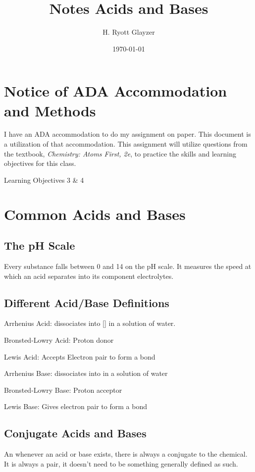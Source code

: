 \documentclass[11pt, letterpaper]{article}
\begin{document}


\title{Notes Acids and Bases}
\author{H. Ryott Glayzer}
\date{\today}


\maketitle


\section*{Notice of ADA Accommodation and Methods}
I have an ADA accommodation to do my assignment on paper.
This document is a utilization of that accommodation.
This assignment will utilize questions from the textbook,
\textit{Chemistry: Atoms First, 2e}, to practice the skills
and learning objectives for this class.

Learning Objectives 3 \& 4

\section*{Common Acids and Bases}
\subsection*{The pH Scale}
Every substance falls between 0 and 14 on the pH scale.
It measures the speed at which an acid separates into its component
electrolytes.
\subsection*{Different Acid/Base Definitions}
Arrhenius Acid: dissociates into [] in a solution of water.

Bronsted-Lowry Acid: Proton  donor

Lewis Acid: Accepts Electron pair to form a bond

Arrhenius Base: dissociates into  in a solution of water

Bronsted-Lowry Base: Proton  acceptor

Lewis Base: Gives electron pair to form a bond

\subsection*{Conjugate Acids and Bases}
An whenever an acid or base exists, there is always a conjugate to the chemical.
It is always a pair, it doesn't need to be something generally defined as such.
\end{document}
